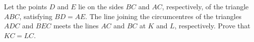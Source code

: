 Let the points $D$ and $E$ lie on the sides $BC$ and $AC$,  respectively, of the triangle $ABC$,  satisfying $BD=AE$. The line joining the circumcentres of the triangles $ADC$ and $BEC$ meets the lines $AC$ and $BC$ at $K$ and $L$,  respectively. Prove that $KC=LC$.